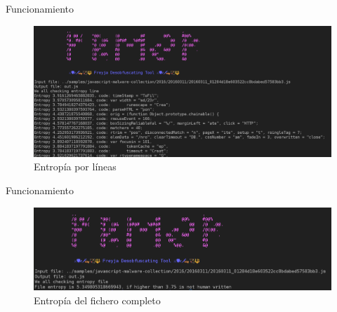 \documentclass[aspectratio=169]{beamer}
\begin{document}
  	\begin{frame}{Funcionamiento}
		\begin{figure}[H]
			\centering
			\includegraphics[width=15cm]{images/line_entropy.png}
			\caption{Entropía por líneas}
		\end{figure}
  	\end{frame}
  	\begin{frame}{Funcionamiento}
		\begin{figure}[H]
			\centering
			\includegraphics[width=15cm]{images/file_entropy.png}
			\caption{Entropía del fichero completo}
		\end{figure}
  	\end{frame}
  	
\end{document}
